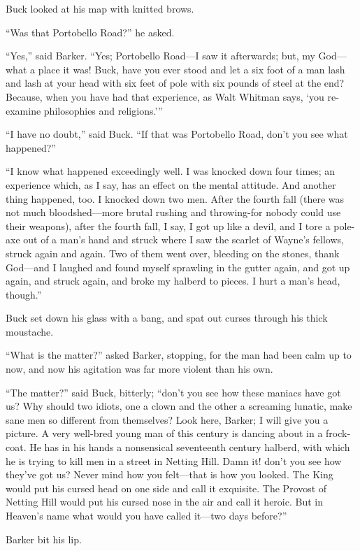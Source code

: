 \documentclass{book}
\begin{document}
Buck looked at his map with knitted brows.

“Was that Portobello Road?” he asked.

“Yes,” said Barker. “Yes; Portobello Road—I saw it afterwards; but, my God—what a place it was! Buck, have you ever stood and let a six foot of a man lash and lash at your head with six feet of pole with six pounds of steel at the end? Because, when you have had that experience, as Walt Whitman says, ‘you re-examine philosophies and religions.’”

“I have no doubt,” said Buck. “If that was Portobello Road, don’t you see what happened?”

“I know what happened exceedingly well. I was knocked down four times; an experience which, as I say, has an effect on the mental attitude. And another thing happened, too. I knocked down two men. After the fourth fall (there was not much bloodshed—more brutal rushing and throwing-for nobody could use their weapons), after the fourth fall, I say, I got up like a devil, and I tore a pole-axe out of a man’s hand and struck where I saw the scarlet of Wayne’s fellows, struck again and again. Two of them went over, bleeding on the stones, thank God—and I laughed and found myself sprawling in the gutter again, and got up again, and struck again, and broke my halberd to pieces. I hurt a man’s head, though.”

Buck set down his glass with a bang, and spat out curses through his thick moustache.

“What is the matter?” asked Barker, stopping, for the man had been calm up to now, and now his agitation was far more violent than his own.

“The matter?” said Buck, bitterly; “don’t you see how these maniacs have got us? Why should two idiots, one a clown and the other a screaming lunatic, make sane men so different from themselves? Look here, Barker; I will give you a picture. A very well-bred young man of this century is dancing about in a frock-coat. He has in his hands a nonsensical seventeenth century halberd, with which he is trying to kill men in a street in Netting Hill. Damn it! don’t you see how they’ve got us? Never mind how you felt—that is how you looked. The King would put his cursed head on one side and call it exquisite. The Provost of Netting Hill would put his cursed nose in the air and call it heroic. But in Heaven’s name what would you have called it—two days before?”

Barker bit his lip.
\end{document}
